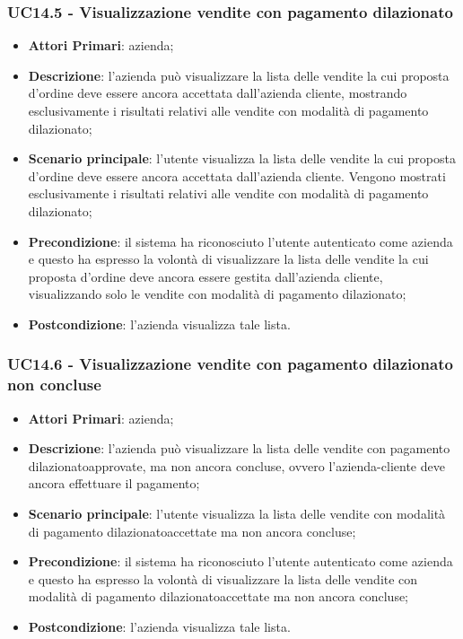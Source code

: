 \subsubsection{UC14.5 - Visualizzazione vendite con pagamento dilazionato}
\begin{itemize}
	\item \textbf{Attori Primari}: azienda;
	\item \textbf{Descrizione}: l'azienda può visualizzare la lista delle vendite la cui proposta d'ordine deve essere ancora accettata dall'azienda cliente, mostrando esclusivamente i risultati relativi alle vendite con modalità di pagamento dilazionato\glo;
	\item \textbf{Scenario principale}: l'utente visualizza la lista delle vendite la cui proposta d'ordine deve essere ancora accettata dall'azienda cliente. Vengono mostrati esclusivamente i risultati relativi alle vendite con modalità di pagamento dilazionato\glo;
	\item \textbf{Precondizione}: il sistema ha riconosciuto l'utente autenticato come azienda e questo ha espresso la volontà di visualizzare la lista delle vendite la cui proposta d'ordine deve ancora essere gestita dall'azienda cliente, visualizzando solo le vendite con modalità di pagamento dilazionato\glo;
	\item \textbf{Postcondizione}: l'azienda visualizza tale lista.
\end{itemize}


\subsubsection{UC14.6 - Visualizzazione vendite con pagamento dilazionato non concluse}
\begin{itemize}
	\item \textbf{Attori Primari}: azienda;
	\item \textbf{Descrizione}: l'azienda può visualizzare la lista delle vendite con pagamento dilazionato\glosp approvate, ma non ancora concluse, ovvero l'azienda-cliente deve ancora effettuare il pagamento;
	\item \textbf{Scenario principale}: l'utente visualizza la lista delle vendite con modalità di pagamento dilazionato\glosp accettate ma non ancora concluse;
	\item \textbf{Precondizione}: il sistema ha riconosciuto l'utente autenticato come azienda e questo ha espresso la volontà di visualizzare la lista delle vendite con modalità di pagamento dilazionato\glosp accettate ma non ancora concluse;
	\item \textbf{Postcondizione}: l'azienda visualizza tale lista.
\end{itemize}

